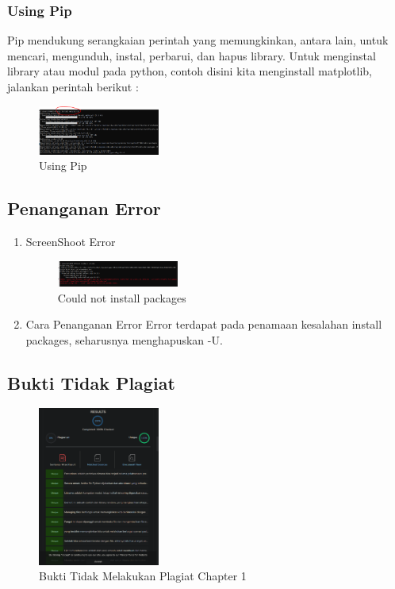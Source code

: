 \subsubsection{Using Pip}
Pip mendukung serangkaian perintah yang memungkinkan, antara lain, untuk mencari, mengunduh, instal, perbarui, dan hapus library. Untuk menginstal library atau modul pada python, contoh disini kita menginstall matplotlib, jalankan perintah berikut :
\hfill\break

	\begin{figure}[H]
		\centering
		\includegraphics[width=4cm]{figures/kelompok1/1/1174021/tugas1/materi/63.PNG}
		\caption{Using Pip}
	\end{figure}
	
\subsection{Penanganan Error}
\begin{enumerate}
	\item ScreenShoot Error
	\begin{figure}[H]
		\includegraphics[width=4cm]{figures/kelompok1/1/1174021/tugas1/error/1.PNG}
		\centering
		\caption{Could not install packages}
	\end{figure}
	\item Cara Penanganan Error
	Error terdapat pada penamaan kesalahan install packages, seharusnya menghapuskan -U.
\end{enumerate}

\subsection{Bukti Tidak Plagiat}
\begin{figure}[H]
\centering
	\includegraphics[width=4cm]{figures/kelompok1/1/1174021/tugas1/buktiplagiat/1.PNG}
	\caption{Bukti Tidak Melakukan Plagiat Chapter 1}
\end{figure}

